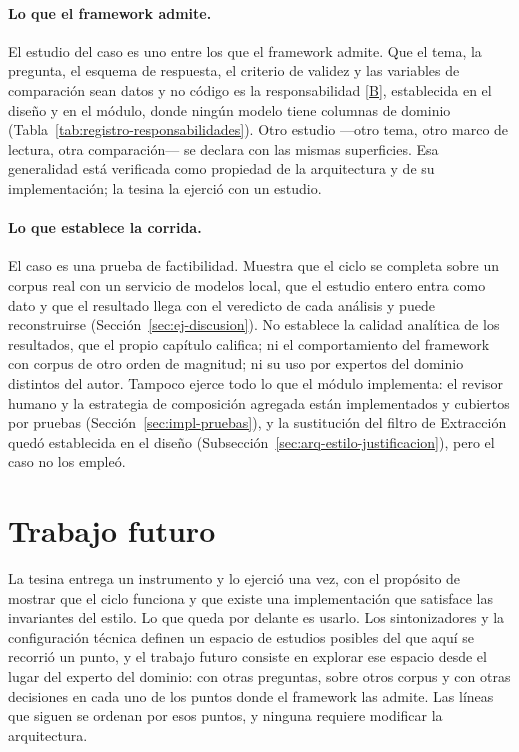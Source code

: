 \documentclass[12pt]{report}
\DeclareRobustCommand{\resp}[1]{\hyperref[tab:registro-responsabilidades]{\textcolor{respcolor}{[#1]}}}
\begin{document}
\paragraph{Lo que el framework admite.} El estudio del caso es uno entre los que el framework admite. Que el tema, la pregunta, el esquema de respuesta, el criterio de validez y las variables de comparación sean datos y no código es la responsabilidad \resp{B}, establecida en el diseño y en el módulo, donde ningún modelo tiene columnas de dominio (Tabla~\ref{tab:registro-responsabilidades}). Otro estudio ---otro tema, otro marco de lectura, otra comparación--- se declara con las mismas superficies. Esa generalidad está verificada como propiedad de la arquitectura y de su implementación; la tesina la ejerció con un estudio.

\paragraph{Lo que establece la corrida.} El caso es una prueba de factibilidad. Muestra que el ciclo se completa sobre un corpus real con un servicio de modelos local, que el estudio entero entra como dato y que el resultado llega con el veredicto de cada análisis y puede reconstruirse (Sección~\ref{sec:ej-discusion}). No establece la calidad analítica de los resultados, que el propio capítulo califica; ni el comportamiento del framework con corpus de otro orden de magnitud; ni su uso por expertos del dominio distintos del autor. Tampoco ejerce todo lo que el módulo implementa: el revisor humano y la estrategia de composición agregada están implementados y cubiertos por pruebas (Sección~\ref{sec:impl-pruebas}), y la sustitución del filtro de Extracción quedó establecida en el diseño (Subsección~\ref{sec:arq-estilo-justificacion}), pero el caso no los empleó.

\section{Trabajo futuro}
\label{sec:conc-futuro}

La tesina entrega un instrumento y lo ejerció una vez, con el propósito de mostrar que el ciclo funciona y que existe una implementación que satisface las invariantes del estilo. Lo que queda por delante es usarlo. Los sintonizadores y la configuración técnica definen un espacio de estudios posibles del que aquí se recorrió un punto, y el trabajo futuro consiste en explorar ese espacio desde el lugar del experto del dominio: con otras preguntas, sobre otros corpus y con otras decisiones en cada uno de los puntos donde el framework las admite. Las líneas que siguen se ordenan por esos puntos, y ninguna requiere modificar la arquitectura.
\end{document}
